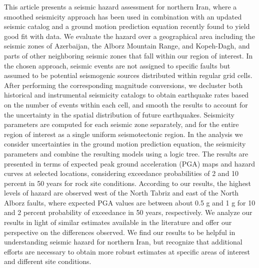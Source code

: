 %
This article presents a seismic hazard assessment for northern Iran, where a smoothed seismicity approach has been used in combination with an updated seismic catalog and a ground motion prediction equation recently found to yield good fit with data. We evaluate the hazard over a geographical area including the seismic zones of Azerbaijan, the Alborz Mountain Range, and Kopeh-Dagh, and parts of other neighboring seismic zones that fall within our region of interest. In the chosen approach, seismic events are not assigned to specific faults but assumed to be potential seismogenic sources distributed within regular grid cells. After performing the corresponding magnitude conversions, we decluster both historical and instrumental seismicity catalogs to obtain earthquake rates based on the number of events within each cell, and smooth the results to account for the uncertainty in the spatial distribution of future earthquakes. Seismicity parameters are computed for each seismic zone separately, and for the entire region of interest as a single uniform seismotectonic region. In the analysis we consider uncertainties in the ground motion prediction equation, the seismicity parameters and combine the resulting models using a logic tree. The results are presented in terms of expected peak ground acceleration (PGA) maps and hazard curves at selected locations, considering exceedance probabilities of 2 and 10 percent in 50 years for rock site conditions. According to our results, the highest levels of hazard are observed west of the North Tabriz and east of the North Alborz faults, where expected PGA values are between about 0.5 g and 1 g for 10 and 2 percent probability of exceedance in 50 years, respectively. We analyze our results in light of similar estimates available in the literature and offer our perspective on the differences observed. We find our results to be helpful in understanding seismic hazard for northern Iran, but recognize that additional efforts are necessary to obtain more robust estimates at specific areas of interest and different site conditions.

%
